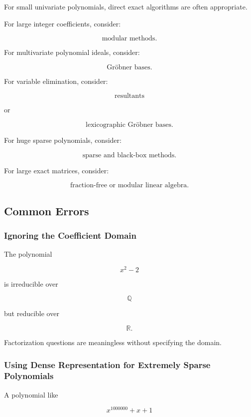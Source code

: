 For small univariate polynomials, direct exact algorithms are often
appropriate.

For large integer coefficients, consider:

\[
\boxed{
\text{modular methods}.
}
\]

For multivariate polynomial ideals, consider:

\[
\boxed{
\text{Gröbner bases}.
}
\]

For variable elimination, consider:

\[
\boxed{
\text{resultants}
}
\]

or

\[
\boxed{
\text{lexicographic Gröbner bases}.
}
\]

For huge sparse polynomials, consider:

\[
\boxed{
\text{sparse and black-box methods}.
}
\]

For large exact matrices, consider:

\[
\boxed{
\text{fraction-free or modular linear algebra}.
}
\]

\subsection{Common Errors}
\label{subsec:computer-algebra-common-errors}

\subsubsection{Ignoring the Coefficient Domain}

The polynomial

\[
x^2-2
\]

is irreducible over

\[
\mathbb{Q}
\]

but reducible over

\[
\mathbb{R}.
\]

Factorization questions are meaningless without specifying the domain.

\subsubsection{Using Dense Representation for Extremely Sparse Polynomials}

A polynomial like

\[
x^{1000000}+x+1
\]

